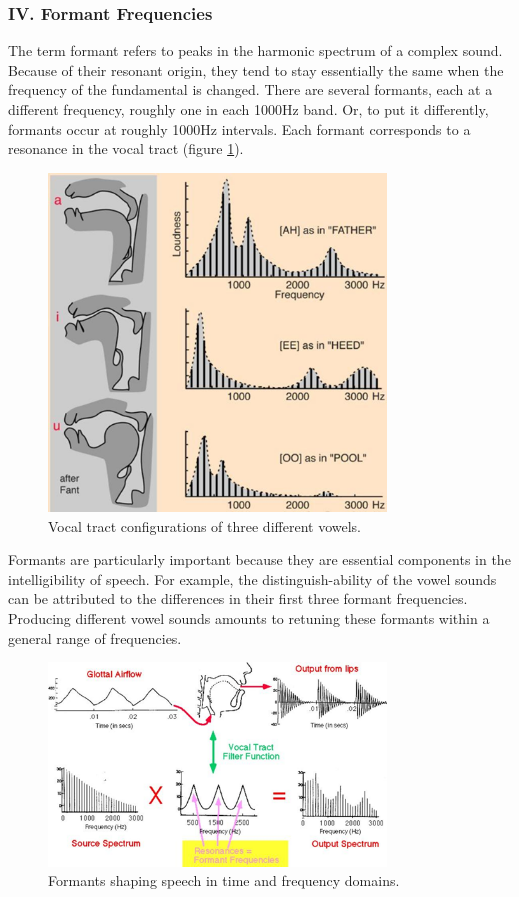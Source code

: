 \documentclass[12pt, a4paper, twoside]{report}
\begin{document}
\subsubsection{IV. Formant Frequencies}
The term formant refers to peaks in the harmonic spectrum of a complex sound. Because of their resonant origin, they tend to stay essentially the same when the frequency of the fundamental is changed. There are several formants, each at a different frequency, roughly one in each 1000Hz band. Or, to put it differently, formants occur at roughly 1000Hz intervals. Each formant corresponds to a resonance in the vocal tract (figure \ref{fig:vocal-tract-vowel}).

\begin{figure}[ht]
	\centering
	\includegraphics[width=0.8\textwidth]
	{images/chapter2/vocal-tract-vowel}
	\caption{Vocal tract configurations of three different vowels.}
	\label{fig:vocal-tract-vowel}
\end{figure}

Formants are particularly important because they are essential components in the intelligibility of speech. For example, the distinguish-ability of the vowel sounds can be attributed to the differences in their first three formant frequencies. Producing different vowel sounds amounts to retuning these formants within a general range of frequencies.

\begin{figure}[ht]
	\centering
	\includegraphics[width=0.8\textwidth]
	{images/chapter2/formant-time-freq}
	\caption{Formants shaping speech in time and frequency domains.}
	\label{fig:formant-time-freq}
\end{figure}
\end{document}
